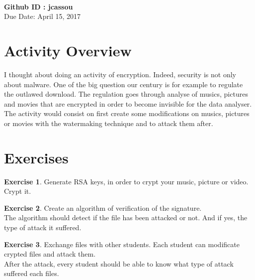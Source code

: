 \documentclass[a4paper, 11pt]{article}
\theoremstyle{definition}
\newtheorem{exercise}{Exercise}
\begin{document}
 \\
         {\phantom{} \hfill \textbf{Github ID : jcassou}} \\
         {\phantom{} \hfill Due Date: April 15, 2017} \\

\section{Activity Overview}

I thought about doing an activity of encryption. Indeed, security is not only about malware. One of the big question our century is for example to regulate the outlawed download. The regulation goes through analyse of musics, pictures and movies that are encrypted in order to become invisible for the data analyser. \\
The activity would consist on first create some modifications on musics, pictures or movies with the watermaking technique and to attack them after.  

\section{Exercises}

\begin{exercise}

	Generate RSA keys, in order to crypt your music, picture or video. Crypt it.

\end{exercise}

\begin{exercise}

	Create an algorithm of verification of the signature. \\
	The algorithm should detect if the file has been attacked or not. And if yes, the type of attack it suffered.
	
\end{exercise}

\begin{exercise}

  Exchange files with other students. Each student can modificate crypted files and attack them. \\
  After the attack, every student should be able to know what type of attack suffered each files.

\end{exercise}
\end{document}

